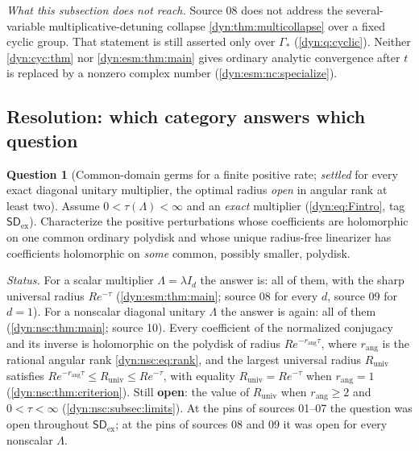 \documentclass[11pt,letterpaper]{article}
\theoremstyle{definition}
\newtheorem{question}[question]{Question}
\theoremstyle{remark}
\newcommand{\sdex}{\mathsf{SD}_{\mathrm{ex}}}
\newcommand{\rang}{r_{\mathrm{ang}}}
\numberwithin{equation}{section}
\begin{document}
\emph{What this subsection does not reach.} Source 08 does not address the
several-variable multiplicative-detuning collapse
\cref{dyn:thm:multicollapse} over a fixed cyclic group. That statement is
still asserted only over $\Gamma_{*}$ (\cref{dyn:q:cyclic}). Neither
\cref{dyn:cyc:thm} nor \cref{dyn:esm:thm:main} gives ordinary analytic
convergence after $t$ is replaced by a nonzero complex number
(\ref{dyn:esm:nc:specialize}).

\subsection{Resolution: which category answers which question}
\label{dyn:subsec:resolution}

\begin{question}[Common-domain germs for a finite positive rate;
\emph{settled} for every exact diagonal unitary multiplier, the optimal
radius \emph{open} in angular rank at least two]\label{dyn:q:commongerm}
Assume $0<\tau(\Lambda)<\infty$ and an \emph{exact} multiplier
(\eqref{dyn:eq:Fintro}, tag $\sdex$). Characterize the positive
perturbations whose coefficients are holomorphic on one common ordinary
polydisk and whose unique radius-free linearizer has coefficients
holomorphic on \emph{some} common, possibly smaller, polydisk.

\emph{Status.} For a scalar multiplier $\Lambda=\lambda I_d$ the answer is:
all of them, with the sharp universal radius $Re^{-\tau}$
(\cref{dyn:esm:thm:main}; source 08 for every $d$, source 09 for $d=1$).
For a nonscalar diagonal unitary $\Lambda$ the answer is again: all of them
(\cref{dyn:nsc:thm:main}; source 10). Every coefficient of the normalized
conjugacy and its inverse is holomorphic on the polydisk of radius
$Re^{-\rang\tau}$, where $\rang$ is the rational angular rank
\eqref{dyn:nsc:eq:rank}, and the largest universal radius $R_{\mathrm{univ}}$
satisfies $Re^{-\rang\tau}\le R_{\mathrm{univ}}\le Re^{-\tau}$, with
equality $R_{\mathrm{univ}}=Re^{-\tau}$ when $\rang=1$
(\cref{dyn:nsc:thm:criterion}). Still \textbf{open}: the value of
$R_{\mathrm{univ}}$ when $\rang\ge2$ and $0<\tau<\infty$
(\cref{dyn:nsc:subsec:limits}). At the pins of sources 01--07 the question
was open throughout $\sdex$; at the pins of sources 08 and 09 it was open
for every nonscalar $\Lambda$.
\end{question}
\end{document}
